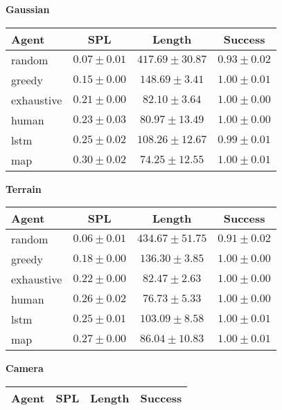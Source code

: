 \textbf{Gaussian}
\vspace{0.5em}

\begin{tabular}{lccc}
    \toprule
    Agent & SPL & Length & Success \\
    \midrule
    random & $0.07 \pm 0.01$ & $417.69 \pm 30.87$ & $0.93 \pm 0.02$\\
    greedy & $0.15 \pm 0.00$ & $148.69 \pm 3.41$ & $1.00 \pm 0.01$\\
    exhaustive & $0.21 \pm 0.00$ & $82.10 \pm 3.64$ & $1.00 \pm 0.00$\\
    human & $0.23 \pm 0.03$ & $80.97 \pm 13.49$ & $1.00 \pm 0.00$\\
    lstm & $0.25 \pm 0.02$ & $108.26 \pm 12.67$ & $0.99 \pm 0.01$\\
    map & $0.30 \pm 0.02$ & $74.25 \pm 12.55$ & $1.00 \pm 0.01$\\
    \bottomrule
\end{tabular}
\vspace{1em}

\textbf{Terrain}
\vspace{0.5em}

\begin{tabular}{lccc}
    \toprule
    Agent & SPL & Length & Success \\
    \midrule
    random & $0.06 \pm 0.01$ & $434.67 \pm 51.75$ & $0.91 \pm 0.02$\\
    greedy & $0.18 \pm 0.00$ & $136.30 \pm 3.85$ & $1.00 \pm 0.00$\\
    exhaustive & $0.22 \pm 0.00$ & $82.47 \pm 2.63$ & $1.00 \pm 0.00$\\
    human & $0.26 \pm 0.02$ & $76.73 \pm 5.33$ & $1.00 \pm 0.00$\\
    lstm & $0.25 \pm 0.01$ & $103.09 \pm 8.58$ & $1.00 \pm 0.01$\\
    map & $0.27 \pm 0.00$ & $86.04 \pm 10.83$ & $1.00 \pm 0.01$\\
    \bottomrule
\end{tabular}
\vspace{1em}

\textbf{Camera}
\vspace{0.5em}

\begin{tabular}{lccc}
    \toprule
    Agent & SPL & Length & Success \\
    \midrule

    \bottomrule
\end{tabular}